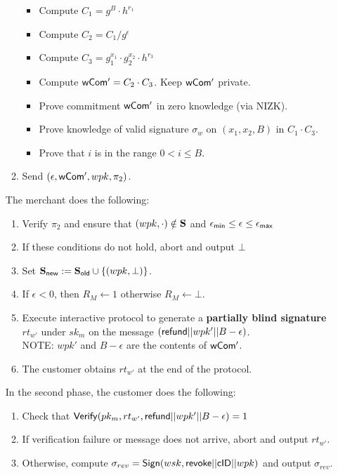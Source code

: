 \documentclass[11pt]{report}
\begin{document}
\begin{enumerate}
\begin{enumerate}
\begin{itemize}
\item Compute $C_1 = g^B \cdot h^{r_1}$
\item Compute $C_2 = C_1 / g^\epsilon$
\item Compute $C_3 = g_1^{x_1} \cdot g_2^{x_2} \cdot h^{r_3}$
\item Compute ${\sf wCom'} = C_2 \cdot C_3$. Keep ${\sf wCom'}$ private.
\item Prove commitment ${\sf wCom'}$ in zero knowledge (via {\sf NIZK}).
\item Prove knowledge of valid signature $\sigma_w$ on $(x_1, x_2, B)$ in $C_1 \cdot C_3$.
\item Prove that $i$ is in the range $0 < i \leq B$.
\end{itemize}


\item Send $(\epsilon, {\sf wCom'}, wpk, \pi_2)$.
\end{enumerate}

\medskip \noindent
The merchant does the following:
\begin{enumerate}
\item Verify $\pi_2$ and ensure that $(wpk, \cdot) \notin {\bf S}$ and $\epsilon_{\sf min} \leq \epsilon \leq \epsilon_{\sf max}$
\item If these conditions do not hold, abort and output $\bot$
\item Set ${\bf S}_{\sf new} := {\bf S}_{\sf old} \cup \{(wpk, \bot)\}$.
\item If $\epsilon < 0$, then $R_{M} \leftarrow 1$ otherwise $R_{M} \leftarrow \bot$.
\item Execute interactive protocol to generate a {\bf partially blind signature} $rt_{w'}$ under $sk_m$ on the message $({\sf refund}||wpk'||B - \epsilon)$.
\\ NOTE: $wpk'$ and $B - \epsilon$ are the contents of ${\sf wCom'}$.
\\ %
\item The customer obtains $rt_{w'}$ at the end of the protocol.
\end{enumerate}

\medskip \noindent
In the second phase, the customer does the following:
\begin{enumerate}
\item Check that ${\sf Verify}(pk_m, rt_{w'}, {\sf refund}||wpk'||B - \epsilon) = 1$
\item If verification failure or message does not arrive, abort and output $rt_{w'}$.
\item Otherwise, compute $\sigma_{rev} = {\sf Sign}(wsk, {\sf revoke}||{\sf cID}||wpk)$ and output $\sigma_{rev}$.
\end{enumerate}


\end{enumerate}
\end{document}
